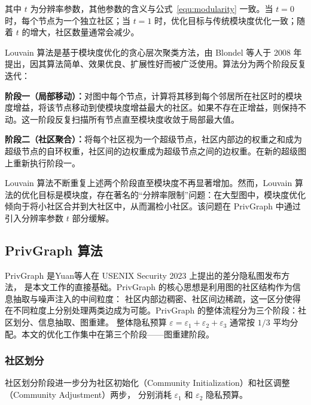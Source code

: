 \par 其中 $t$ 为分辨率参数，其他参数的含义与公式~\ref{equ:modularity} 一致。当 $t = 0$ 时，每个节点为一个独立社区；当 $t = 1$ 时，优化目标与传统模块度优化一致；随着 $t$ 的增大，社区数量通常会减少。
\par Louvain 算法是基于模块度优化的贪心层次聚类方法，由 Blondel 等人于 2008 年提出，因其算法简单、效果优良、扩展性好而被广泛使用。算法分为两个阶段反复迭代：

\par \textbf{阶段一（局部移动）：}对图中每个节点，计算将其移到每个邻居所在社区时的模块度增益，将该节点移动到使模块度增益最大的社区。如果不存在正增益，则保持不动。这一阶段反复扫描所有节点直至模块度收敛于局部最大值。

\par \textbf{阶段二（社区聚合）：}将每个社区视为一个超级节点，社区内部边的权重之和成为超级节点的自环权重，社区间的边权重成为超级节点之间的边权重。在新的超级图上重新执行阶段一。

\par Louvain 算法不断重复上述两个阶段直至模块度不再显著增加。然而，Louvain 算法的优化目标是模块度，存在著名的``分辨率限制''问题：在大型图中，模块度优化倾向于将小社区合并到大社区中，从而漏检小社区。该问题在 PrivGraph 中通过引入分辨率参数 $t$ 部分缓解。

\subsection{PrivGraph 算法}

\par PrivGraph 是Yuan等人在 USENIX Security 2023 上提出的差分隐私图发布方法，
是本文工作的直接基础。PrivGraph 的核心思想是利用图的社区结构作为信息抽取与噪声注入的中间粒度：
社区内部边稠密、社区间边稀疏，这一区分使得在不同粒度上分别处理两类边成为可能。PrivGraph 
的整体流程分为三个阶段：社区划分、信息抽取、图重建。
整体隐私预算 $\varepsilon = \varepsilon_1 + \varepsilon_2 + \varepsilon_3$ 
通常按 $1/3$ 平均分配。本文的优化工作集中在第三个阶段——图重建阶段。

\subsubsection{社区划分}

\par 社区划分阶段进一步分为社区初始化（Community Initialization）和社区调整（Community Adjustment）两步，
分别消耗 $\varepsilon_1$ 和 $\varepsilon_2$ 隐私预算。

